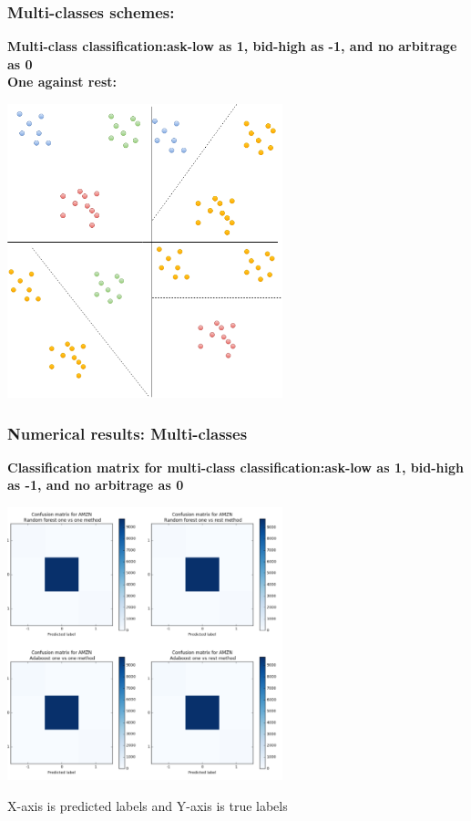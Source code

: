 \documentclass[xcolor={x11names,svgnames,dvipsnames}]{beamer}
\begin{document}
\begin{frame}
\frametitle{Multi-classes schemes:}
\textbf{Multi-class classification:ask-low as 1, bid-high as -1, and no arbitrage as 0}\\
\textbf{One against rest:}
\begin{center}
     \includegraphics[width=0.6\textwidth, height=0.6\textheight]{onevsrest.png}
\end{center}     

\end{frame}

\begin{frame}
\frametitle{Numerical results: Multi-classes}
\textbf{Classification matrix for multi-class classification:ask-low as 1, bid-high as -1, and no arbitrage as 0}\\

\begin{center}
     \includegraphics[width=0.6\textwidth, height=0.6\textheight]{amzn_confusion_matrix.png}
\end{center}     

X-axis is predicted labels and Y-axis is true labels

\end{frame}
\end{document}
